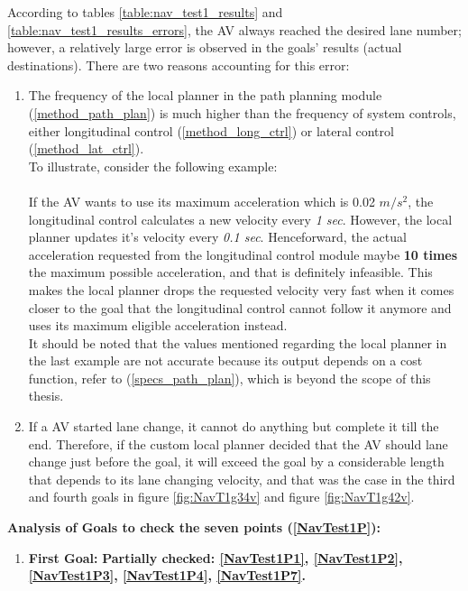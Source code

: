 \begin{enumerate}
\begin{itemize}
        According to tables \ref{table:nav_test1_results} and \ref{table:nav_test1_results_errors}, the AV always reached the desired lane number; however, a relatively large error is observed in the goals' results (actual destinations). There are two reasons accounting for this error:
        \begin{enumerate}
            \item The frequency of the local planner in the path planning module (\ref{method_path_plan}) is much higher than the frequency of system controls, either longitudinal control (\ref{method_long_ctrl}) or lateral control (\ref{method_lat_ctrl}). \\ To illustrate, consider the following example: 
            \\ \\
            If the AV wants to use its maximum acceleration which is 0.02 $m/s^{2}$, the longitudinal control calculates a new velocity every \textit{1 sec}. However, the local planner updates it's velocity every \textit{0.1 sec}. Henceforward, the actual acceleration requested from the longitudinal control module maybe \textbf{10 times} the maximum possible acceleration, and that is definitely infeasible. This makes the local planner drops the requested velocity very fast when it comes closer to the goal that the longitudinal control cannot follow it anymore and uses its maximum eligible acceleration instead. \\
            It should be noted that the values mentioned regarding the local planner in the last example are not accurate because its output depends on a cost function, refer to (\ref{specs_path_plan}), which is beyond the scope of this thesis.
            \item If a AV started lane change, it cannot do anything but complete it till the end. Therefore, if the custom local planner decided that the AV should lane change just before the goal, it will exceed the goal by a considerable length that depends to its lane changing velocity, and that was the case in the third and fourth goals in figure \ref{fig:NavT1g34v} and figure \ref{fig:NavT1g42v}. 
        \end{enumerate}
        \textbf{Analysis of Goals to check the seven points (\ref{NavTest1P}):}
        \begin{enumerate}
            \item \textbf{First Goal: }
            \textbf{Partially checked: \ref{NavTest1P1}, \ref{NavTest1P2}, \ref{NavTest1P3}, \ref{NavTest1P4}, \ref{NavTest1P7}.}
            

\end{enumerate}
\end{itemize}
\end{enumerate}
